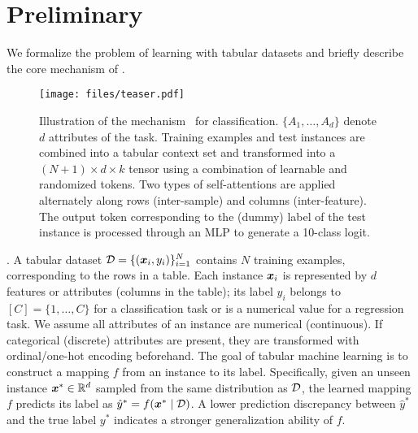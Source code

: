 \section{Preliminary}\label{sec:relimiary}
We formalize the problem of learning with tabular datasets and briefly describe the core mechanism of \ours.
\begin{figure}
    \centering
        \vspace{-2mm}
    \texttt{[image: files/teaser.pdf]}
    \vspace{-7mm}
    \caption{Illustration of the \ours mechanism~\cite{hollmann2025TabPFNv2} for classification.
    $\{A_1, \ldots, A_d\}$ denote $d$ attributes of the task. 
    Training examples and test instances are combined into a tabular context set and transformed into a ${(N+1) \times d \times k}$ tensor using a combination of learnable and randomized tokens.
    Two types of self-attentions are applied alternately along rows (inter-sample) and columns (inter-feature).
    The output token corresponding to the (dummy) label of the test instance is processed through an MLP to generate a 10-class logit.
    }
    \label{fig:tabpfnv2}
\end{figure}

.
A tabular dataset ${\mathcal{D}} = \{({\bm{x}}_i, y_i)\}_{i=1}^N$ contains $N$ training examples, corresponding to the rows in a table. Each instance ${\bm{x}}_i$ is represented by $d$ features or attributes (columns in the table); its label $y_i$ belongs to $[C] = \{1, \ldots, C\}$ for a classification task or is a numerical value for a regression task.
We assume all attributes of an instance are numerical (continuous). If categorical (discrete) attributes are present, they are transformed with ordinal/one-hot encoding beforehand. The goal of tabular machine learning is to construct a mapping $f$ from an instance to its label. Specifically, given an unseen instance ${\bm{x}}^* \in {\mathbb{R}}^d$ sampled from the same distribution as ${\mathcal{D}}$, the learned mapping $f$ predicts its label as $\hat{y}^* = f({\bm{x}}^* \mid {\mathcal{D}})$. A lower prediction discrepancy between $\hat{y}^*$ and the true label $y^*$ indicates a stronger generalization ability of $f$.


